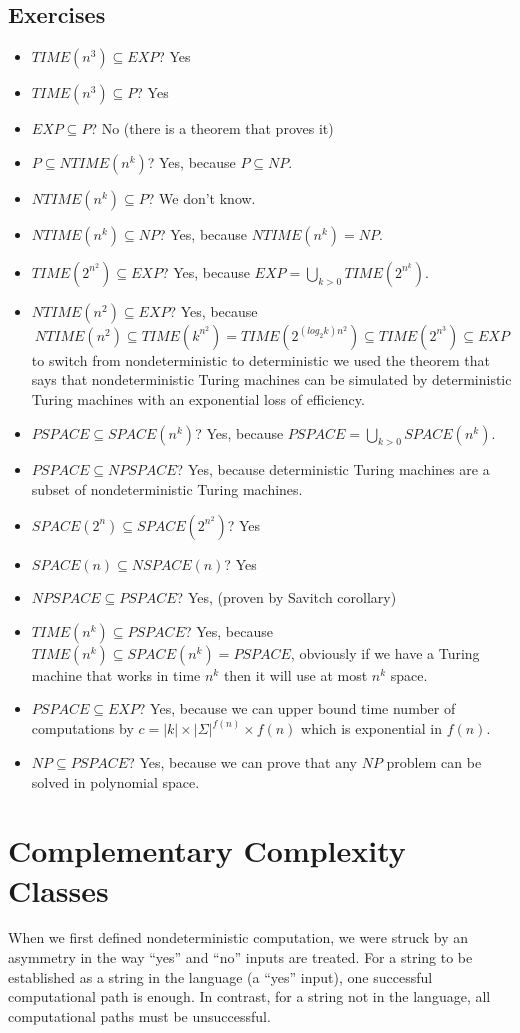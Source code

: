 \documentclass[12pt]{article}
\begin{document}
\subsection{Exercises}
\begin{itemize}
  \item $TIME(n^3)\subseteq EXP$? Yes
  \item $TIME(n^3)\subseteq P$? Yes
  \item $EXP\subseteq P$? No (there is a theorem that proves it)
  \item $P\subseteq NTIME(n^k)$? Yes, because $P\subseteq NP$.
  \item $NTIME(n^k)\subseteq P$? We don't know.
  \item $NTIME(n^k)\subseteq NP$? Yes, because $NTIME(n^k)=NP$.
  \item $TIME(2^{n^2})\subseteq EXP$? Yes, because $EXP = \bigcup\limits_{k > 0} TIME(2^{n^k})$.
  \item $NTIME(n^2)\subseteq EXP$? Yes, because 
  $$NTIME(n^2)\subseteq TIME(k^{n^2})=TIME(2^{(log_2k)n^2})\subseteq TIME(2^{n^3})\subseteq EXP$$ to switch from nondeterministic to deterministic we used the theorem that says that nondeterministic Turing machines can be simulated by deterministic Turing machines with an exponential loss of efficiency.
  \item $PSPACE\subseteq SPACE(n^k)$? Yes, because $PSPACE = \bigcup\limits_{k > 0} SPACE(n^k)$.
  \item $PSPACE\subseteq NPSPACE$? Yes, because deterministic Turing machines are a subset of nondeterministic Turing machines.
  \item $SPACE(2^n)\subseteq SPACE(2^{n^2})$? Yes
  \item $SPACE(n)\subseteq NSPACE(n)$? Yes
  \item $NPSPACE\subseteq PSPACE$? Yes, (proven by Savitch corollary)
  \item $TIME(n^k)\subseteq PSPACE$? Yes, because $TIME(n^k)\subseteq SPACE(n^k) = PSPACE$, obviously if we have a Turing machine that works in time $n^k$ then it will use at most $n^k$ space.
  \item $PSPACE\subseteq EXP$? Yes, because we can upper bound time number of computations by $c= |k|\times|\Sigma|^{f(n)}\times f(n)$ which is exponential in $f(n)$.
  \item $NP\subseteq PSPACE$? Yes, because we can prove that any $NP$ problem can be solved in polynomial space.
\end{itemize}
\section{Complementary Complexity Classes}
When we first defined nondeterministic computation, we were struck by an asymmetry in the way ``yes'' and ``no'' inputs are treated. For a string to be established as a string in the language (a ``yes'' input), one successful computational path is enough. In contrast, for a string not in the language, all computational paths must be unsuccessful. 
\end{document}
